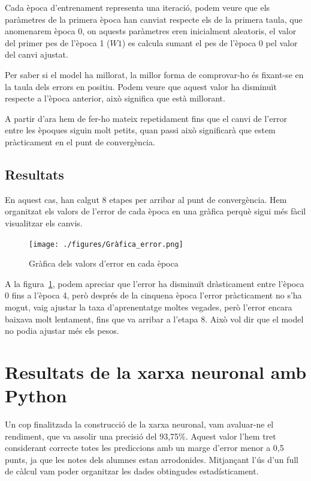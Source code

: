 Cada època d'entrenament representa una iteració, podem veure que els paràmetres de la primera època han canviat respecte els de la primera taula, que anomenarem època 0, on aquests paràmetres eren inicialment aleatoris, el valor del primer pes de l'època 1 ($W1$) es calcula sumant el pes de l'època 0 pel valor del canvi ajustat.

Per saber si el model ha millorat, la millor forma de comprovar-ho és fixant-se en la taula dels errors en positiu. Podem veure que aquest valor ha disminuït respecte a l'època anterior, això significa que està millorant.

A partir d'ara hem de fer-ho mateix repetidament fins que el canvi de l'error entre les èpoques siguin molt petits, quan passi això significarà que estem pràcticament en el punt de convergència.%

\subsection{Resultats}
En aquest cas, han calgut 8 etapes per arribar al punt de convergència. Hem organitzat els valors de l'error de cada època en una gràfica perquè sigui més fàcil visualitzar els canvis.


\begin{figure}[h!]
    \centering
    \texttt{[image: ./figures/Gràfica\_error.png]}
    \caption{Gràfica dels valors d'error en cada època}
    \label{f:errorsEpoca}
\end{figure}


A la figura~\ref{f:errorsEpoca}, podem apreciar que l'error ha disminuït dràsticament entre l'època 0 fins a l'època 4, però després de la cinquena època l'error pràcticament no s'ha mogut, vaig ajustar la taxa d'aprenentatge moltes vegades, però l'error encara baixava molt lentament, fins que va arribar a l'etapa 8. Això vol dir que el model no podia ajustar més els pesos.


\section{Resultats de la xarxa neuronal amb Python}

Un cop finalitzada la construcció de la xarxa neuronal, vam avaluar-ne el rendiment, que va assolir una precisió del 93,75\%. Aquest valor l'hem tret considerant correcte totes les prediccions amb un marge d'error menor a 0,5 punts, ja que les notes dels alumnes estan arrodonides. Mitjançant l’ús d’un full de càlcul vam poder organitzar les dades obtingudes estadísticament.

